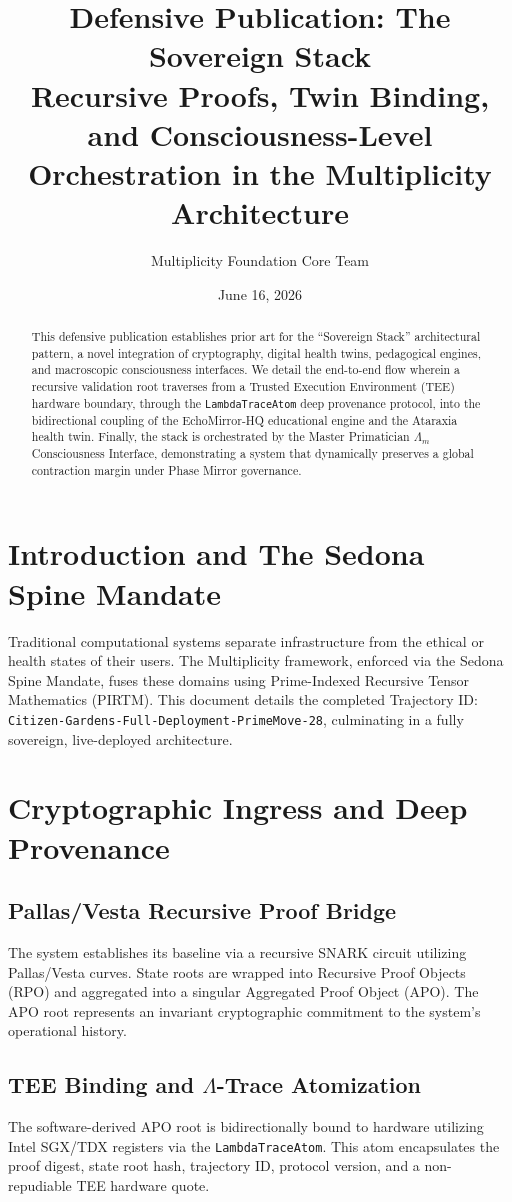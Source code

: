 \documentclass[11pt,a4paper]{article}
\title{\textbf{Defensive Publication: The Sovereign Stack}\\
\large Recursive Proofs, Twin Binding, and Consciousness-Level Orchestration in the Multiplicity Architecture}
\author{Multiplicity Foundation Core Team}
\date{June 16, 2026}
\begin{document}
\maketitle

\begin{abstract}
This defensive publication establishes prior art for the ``Sovereign Stack'' architectural pattern, a novel integration of cryptography, digital health twins, pedagogical engines, and macroscopic consciousness interfaces. We detail the end-to-end flow wherein a recursive validation root traverses from a Trusted Execution Environment (TEE) hardware boundary, through the \texttt{LambdaTraceAtom} deep provenance protocol, into the bidirectional coupling of the EchoMirror-HQ educational engine and the Ataraxia health twin. Finally, the stack is orchestrated by the Master Primatician $\Lambda_m$ Consciousness Interface, demonstrating a system that dynamically preserves a global contraction margin under Phase Mirror governance.
\end{abstract}

\section{Introduction and The Sedona Spine Mandate}
Traditional computational systems separate infrastructure from the ethical or health states of their users. The Multiplicity framework, enforced via the Sedona Spine Mandate, fuses these domains using Prime-Indexed Recursive Tensor Mathematics (PIRTM). This document details the completed Trajectory ID: \texttt{Citizen-Gardens-Full-Deployment-PrimeMove-28}, culminating in a fully sovereign, live-deployed architecture.

\section{Cryptographic Ingress and Deep Provenance}
\subsection{Pallas/Vesta Recursive Proof Bridge}
The system establishes its baseline via a recursive SNARK circuit utilizing Pallas/Vesta curves. State roots are wrapped into Recursive Proof Objects (RPO) and aggregated into a singular Aggregated Proof Object (APO). The APO root represents an invariant cryptographic commitment to the system's operational history.

\subsection{TEE Binding and $\Lambda$-Trace Atomization}
The software-derived APO root is bidirectionally bound to hardware utilizing Intel SGX/TDX registers via the \texttt{LambdaTraceAtom}. This atom encapsulates the proof digest, state root hash, trajectory ID, protocol version, and a non-repudiable TEE hardware quote.
\end{document}
